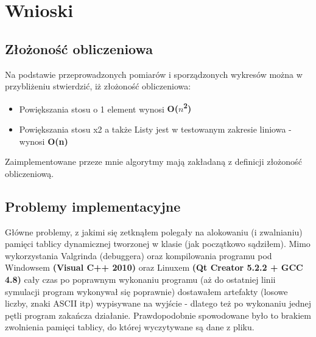 \documentclass[12pt,a4paper,oneside]{article}
\begin{document}
\section{Wnioski}
\subsection{Złożoność obliczeniowa}
Na podstawie przeprowadzonych pomiarów i sporządzonych wykresów można w przybliżeniu stwierdzić, iż złożoność obliczeniowa:
\begin{itemize}
	\item Powiększania stosu o 1 element wynosi \textbf{O($n$\textsuperscript{2})}
	\item Powiększania stosu x2 a także Listy jest w testowanym zakresie liniowa - wynosi \textbf{O(n)}	
\end{itemize}
Zaimplementowane przeze mnie algorytmy mają zakładaną z definicji złożoność obliczeniową.

\subsection{Problemy implementacyjne}
Główne problemy, z jakimi się zetknąłem polegały na alokowaniu (i zwalnianiu) pamięci tablicy dynamicznej tworzonej w klasie (jak początkowo sądziłem). Mimo wykorzystania Valgrinda (debuggera) oraz kompilowania programu pod Windowsem \textbf{(Visual C++ 2010)} oraz Linuxem \textbf{(Qt Creator 5.2.2 + GCC 4.8)} cały czas po poprawnym wykonaniu programu (aż do ostatniej linii symulacji program wykonywał się poprawnie) dostawałem artefakty (losowe liczby, znaki ASCII itp) wypisywane na wyjście - dlatego też po wykonaniu jednej pętli program zakańcza działanie. Prawdopodobnie spowodowane było to brakiem zwolnienia pamięci tablicy, do której wyczytywane są dane z pliku. 
\end{document}

